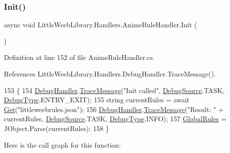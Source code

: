 \subsubsection{\texorpdfstring{Init()}{Init()}}
{\footnotesize\ttfamily async void Little\+Weeb\+Library.\+Handlers.\+Anime\+Rule\+Handler.\+Init (\begin{DoxyParamCaption}{ }\end{DoxyParamCaption})\hspace{0.3cm}{\ttfamily [private]}}



Definition at line 152 of file Anime\+Rule\+Handler.\+cs.



References Little\+Weeb\+Library.\+Handlers.\+Debug\+Handler.\+Trace\+Message().


\begin{DoxyCode}
153         \{
154             \mbox{\hyperlink{class_little_weeb_library_1_1_handlers_1_1_anime_rule_handler_a6ad89134d97d818f3b2deebb7e2cf361}{DebugHandler}}.\mbox{\hyperlink{interface_little_weeb_library_1_1_handlers_1_1_i_debug_handler_a2e405bc3492e683cd3702fae125221bc}{TraceMessage}}(\textcolor{stringliteral}{"Init called"}, 
      \mbox{\hyperlink{namespace_little_weeb_library_1_1_handlers_a2a6ca0775121c9c503d58aa254d292be}{DebugSource}}.TASK, \mbox{\hyperlink{namespace_little_weeb_library_1_1_handlers_ab66019ed40462876ec4e61bb3ccb0a62}{DebugType}}.ENTRY\_EXIT);
155             \textcolor{keywordtype}{string} currentRules = await \mbox{\hyperlink{class_little_weeb_library_1_1_handlers_1_1_anime_rule_handler_a721f5c5ac798ca7e81286b3f401921fb}{Get}}(\textcolor{stringliteral}{"littleweebrules.json"});
156             \mbox{\hyperlink{class_little_weeb_library_1_1_handlers_1_1_anime_rule_handler_a6ad89134d97d818f3b2deebb7e2cf361}{DebugHandler}}.\mbox{\hyperlink{interface_little_weeb_library_1_1_handlers_1_1_i_debug_handler_a2e405bc3492e683cd3702fae125221bc}{TraceMessage}}(\textcolor{stringliteral}{"Result: "} + currentRules, 
      \mbox{\hyperlink{namespace_little_weeb_library_1_1_handlers_a2a6ca0775121c9c503d58aa254d292be}{DebugSource}}.TASK, \mbox{\hyperlink{namespace_little_weeb_library_1_1_handlers_ab66019ed40462876ec4e61bb3ccb0a62}{DebugType}}.INFO);
157             \mbox{\hyperlink{class_little_weeb_library_1_1_handlers_1_1_anime_rule_handler_aff5df38f10696987486267a30095ad49}{GlobalRules}} = JObject.Parse(currentRules);
158         \}
\end{DoxyCode}
Here is the call graph for this function\+:\nopagebreak
